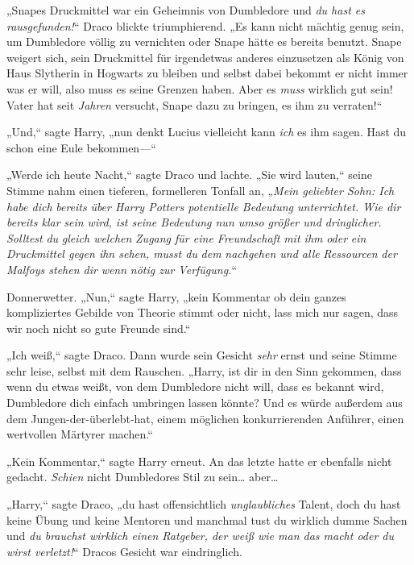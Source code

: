 {„Snapes Druckmittel war ein Geheimnis von Dumbledore und \emph{du hast es rausgefunden!}“ Draco blickte triumphierend. „Es kann nicht mächtig genug sein, um Dumbledore völlig zu vernichten oder Snape hätte es bereits benutzt. Snape weigert sich, sein Druckmittel für irgendetwas anderes einzusetzen als König von Haus Slytherin in Hogwarts zu bleiben und selbst dabei bekommt er nicht immer was er will, also muss es seine Grenzen haben. Aber es \emph{muss} wirklich gut sein! Vater hat seit \emph{Jahren} versucht, Snape dazu zu bringen, es ihm zu verraten!“

„Und,“ sagte Harry, „nun denkt Lucius vielleicht kann \emph{ich} es ihm sagen. Hast du schon eine Eule bekommen—“

„Werde ich heute Nacht,“ sagte Draco und lachte. „Sie wird lauten,“ seine Stimme nahm einen tieferen, formelleren Tonfall an, „\emph{Mein geliebter Sohn: Ich habe dich} \emph{bereits} \emph{über Harry Potters potentielle Bedeutung unterrichtet. Wie dir bereits klar} \emph{sein wird, ist seine Bedeutung nun umso größer und dringlicher.} \emph{Solltest} \emph{du} \emph{gleich welchen} \emph{Zugang für eine Freundschaft} \emph{mit ihm} \emph{oder} \emph{ein} \emph{Druckmittel gegen ihn sehen, musst du} \emph{dem} \emph{nachgehen und alle} \emph{Ressourcen} \emph{der Malfoys stehen dir} \emph{wenn} \emph{nötig zur Verfügung.}“

Donnerwetter. „Nun,“ sagte Harry, „kein Kommentar ob dein ganzes kompliziertes Gebilde von Theorie stimmt oder nicht, lass mich nur sagen, dass wir noch nicht so gute Freunde sind.“

„Ich weiß,“ sagte Draco. Dann wurde sein Gesicht \emph{sehr} ernst und seine Stimme sehr leise, selbst mit dem Rauschen. „Harry, ist dir in den Sinn gekommen, dass wenn du etwas weißt, von dem Dumbledore nicht will, dass es bekannt wird, Dumbledore dich einfach umbringen lassen könnte? Und es würde außerdem aus dem Jungen-der-überlebt-hat, einem möglichen konkurrierenden Anführer, einen wertvollen Märtyrer machen.“

„Kein Kommentar,“ sagte Harry erneut. An das letzte hatte er ebenfalls nicht gedacht. \emph{Schien} nicht Dumbledores Stil zu sein… aber…

„Harry,“ sagte Draco, „du hast offensichtlich \emph{unglaubliches} Talent, doch du hast keine Übung und keine Mentoren und manchmal tust du wirklich dumme Sachen und \emph{du brauchst wirklich einen Ratgeber, der weiß wie man das macht oder du wirst verletzt!}“ Dracos Gesicht war eindringlich.

}
